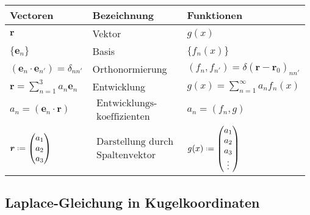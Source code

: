 \documentclass[titlepage,11pt,a4paper,ngerman]{report}
\newcommand*{\defeq}{\mathrel{\vcenter{\baselineskip0.5ex \lineskiplimit0pt \hbox{\scriptsize.}\hbox{\scriptsize.}}}=}
\newcommand{\tx}[1]{\textrm{#1}}
\newcommand{\delfkt}{\delta(\vec{r} - \vec{r}_0)}
\renewcommand{\vec}[1]{\boldsymbol{#1}}
\begin{document}
\begin{center}
	\begin{tabular*}{.9\textwidth}{@{\extracolsep{\fill}}lll}
		\hline
		Vectoren & Bezeichnung & Funktionen\\
		\hline
		$ \vec{r} $ & Vektor & $ g(x) $ \\
		$ \{\vec{e}_n\} $ & Basis & $ \{f_n(x)\} $\\
		$ (\vec{e}_n \cdot \vec{e}_{n'}) = \delta_{nn'} $ & Orthonormierung & $ (f_n, f_{n'}) = \delfkt_{nn'} $\\
		${\displaystyle \vec{r} = \sum_{n=1}^{3} a_n \vec{e}_n }$ & Entwicklung & $ {\displaystyle g(x) = \sum_{n=1}^{\infty} a_n f_n(x) }$\\
		$ a_n = (\vec{e}_n \cdot \vec{r}) $ & \hspace{-8.5pt} $ \begin{array}{l}
			\tx{Entwicklungs-}\\
			\tx{koeffizienten}
		\end{array}$ & $ a_n = (f_n,g) $\\
		$ \vec{r} \defeq \begin{pmatrix}
		a_1 \\ a_2 \\ a_3
		\end{pmatrix} $ & \hspace{-8.5pt} $ \begin{array}{l}
		\tx{Darstellung durch}\\
		\tx{Spaltenvektor}
		\end{array} $ & $ g(x) \defeq \begin{pmatrix}
		a_1 \\ a_2 \\ a_3 \\ \vdots
		\end{pmatrix} $
	\end{tabular*}
\end{center}

\subsection{Laplace-Gleichung in Kugelkoordinaten}
\end{document}

